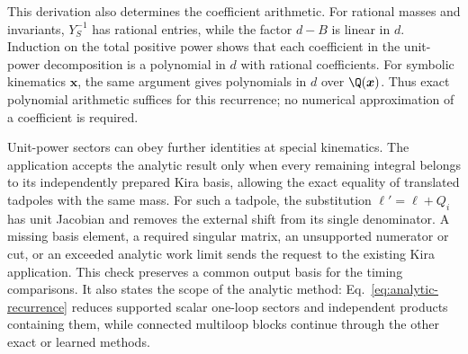 This derivation also determines the coefficient arithmetic. For rational masses and invariants, $Y_S^{-1}$ has rational entries, while the factor $d-B$ is linear in $d$. Induction on the total positive power shows that each coefficient in the unit-power decomposition is a polynomial in $d$ with rational coefficients. For symbolic kinematics $\boldsymbol x$, the same argument gives polynomials in $d$ over $\Q(\boldsymbol x)$. Thus exact polynomial arithmetic suffices for this recurrence; no numerical approximation of a coefficient is required.

Unit-power sectors can obey further identities at special kinematics. The application accepts the analytic result only when every remaining integral belongs to its independently prepared Kira basis, allowing the exact equality of translated tadpoles with the same mass. For such a tadpole, the substitution $\ell'=\ell+Q_i$ has unit Jacobian and removes the external shift from its single denominator. A missing basis element, a required singular matrix, an unsupported numerator or cut, or an exceeded analytic work limit sends the request to the existing Kira application. This check preserves a common output basis for the timing comparisons. It also states the scope of the analytic method: Eq.~\eqref{eq:analytic-recurrence} reduces supported scalar one-loop sectors and independent products containing them, while connected multiloop blocks continue through the other exact or learned methods.
